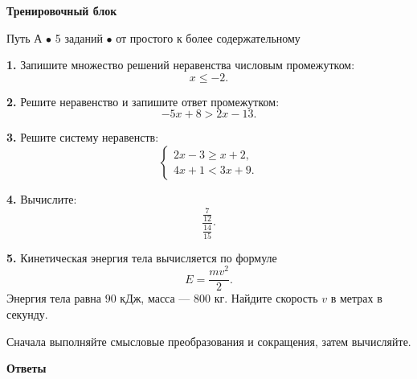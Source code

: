 \documentclass[a4paper,12pt]{article}
\begin{document}
\clearpage

\begin{center}
{\Large\bfseries\color{darkaccent}Тренировочный блок}

\vspace{2mm}
{\small Путь А \(\bullet\) 5 заданий \(\bullet\) от простого к более содержательному}
\end{center}

\vspace{6mm}

\textbf{1.} Запишите множество решений неравенства числовым промежутком:
\[
x\le-2.
\]

\vspace{6mm}

\textbf{2.} Решите неравенство и запишите ответ промежутком:
\[
-5x+8>2x-13.
\]

\vspace{6mm}

\textbf{3.} Решите систему неравенств:
\[
\begin{cases}
2x-3\ge x+2,\\
4x+1<3x+9.
\end{cases}
\]

\vspace{6mm}

\textbf{4.} Вычислите:
\[
\frac{\frac{7}{12}}{\frac{14}{15}}.
\]

\vspace{6mm}

\textbf{5.} Кинетическая энергия тела вычисляется по формуле
\[
E=\frac{mv^2}{2}.
\]
Энергия тела равна \(90\) кДж, масса --- \(800\) кг. Найдите скорость \(v\) в метрах в секунду.

\vfill

\begin{center}
\small
Сначала выполняйте смысловые преобразования и сокращения, затем вычисляйте.
\end{center}

\clearpage

\begin{center}
{\Large\bfseries\color{darkaccent}Ответы}
\end{center}

\vspace{6mm}
\end{document}
